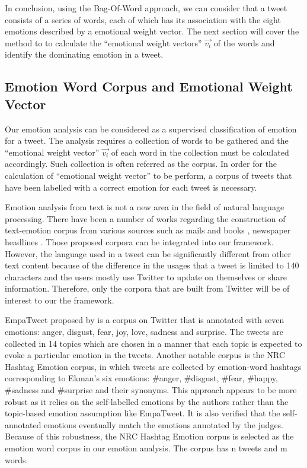 In conclusion, using the Bag-Of-Word approach, we can consider that a tweet consists of a series of words, each of which has its association with the eight emotions described by a emotional weight vector. The next section will cover the method to to calculate the ``emotional weight vectors'' \(\vec{v_i}\) of the words and identify the dominating emotion in a tweet.

\subsection{Emotion Word Corpus and Emotional Weight Vector}
Our emotion analysis can be considered as a supervised classification of emotion for a tweet. The analysis requires a collection of words to be gathered and the ``emotional weight vector'' \(\vec{v_i}\) of each word in the collection must be calculated accordingly. Such collection is often referred as the corpus. In order for the calculation of ``emotional weight vector'' to be perform, a corpus of tweets that have been labelled with a correct emotion for each tweet is necessary.

Emotion analysis from text is not a new area in the field of natural language processing. There have been a number of works regarding the construction of text-emotion corpus from various sources such as mails \citep{mohammad2011tracking} and books \citep{mohammad2011once}, newspaper headlines \citep{strapparava2008learning}. Those proposed corpora can be integrated into our framework. However, the language used in a tweet can be significantly different from other text content because of the difference in the usages that a tweet is limited to 140 characters and the users mostly use Twitter to update on themselves or share information. Therefore, only the corpora that are built from Twitter will be of interest to our the framework.

EmpaTweet proposed by \citet{roberts2012empatweet} is a corpus on Twitter that is annotated with seven emotions: anger, disgust, fear, joy, love, sadness and surprise. The tweets are collected in 14 topics which are chosen in a manner that each topic is expected to evoke a particular emotion in the tweets. Another notable corpus is the NRC Hashtag Emotion corpus, in which tweets are collected by emotion-word hashtags corresponding to Ekman's six emotions: \#anger, \#disgust, \#fear, \#happy, \#sadness and \#surprise and their synonyms\citep{mohammad2012emotional}. This approach appears to be more robust as it relies on the self-labelled emotions by the authors rather than the topic-based emotion assumption like EmpaTweet. It is also verified that the self-annotated emotions eventually match the emotions annotated by the judges. Because of this robustness, the NRC Hashtag Emotion corpus is selected as the emotion word corpus in our emotion analysis. The corpus has n tweets and m words.

